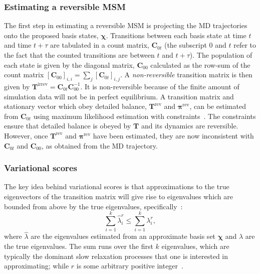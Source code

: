 \documentclass[journal=jacsat,manuscript=article]{achemso}
\begin{document}
\subsubsection{Estimating a reversible MSM}

The first step in estimating a reversible MSM is projecting the MD trajectories onto the proposed basis states, $\bm{\chi}$. Transitions between each basis state at time $t$ and time $t + \tau$ are tabulated in a count matrix, $\mathbf{C}_{0t}$ (the subscript $0$ and $t$ refer to the fact that the counted transitions are between $t$ and $t+\tau$). The population of each state is given by the diagonal matrix, $\mathbf{C}_{00}$ calculated as the row-sum of the count matrix $[\mathbf{C}_{00}]_{i, i} = \sum_j [\mathbf{C}_{0t}]_{i, j}$.  A \emph{non-reversible} transition matrix is then given by $\mathbf{T}^{\mathrm{irrev}} = \mathbf{C}_{0t}\mathbf{C}_{00}^{-1}$. It is non-reversible because of the finite amount of simulation data will not be in perfect equilibrium. A transition matrix and stationary vector which obey detailed balance, $\mathbf{T}^{\mathrm{rev}}$ and $\bm{\pi}^{\mathrm{rev}}$, can be estimated from $\mathbf{C}_{0t}$ using maximum likelihood estimation with constraints~\cite{trendelkamp-schroer_estimation_2015}. The constraints ensure that detailed balance is obeyed by $\mathbf{T}$ and its dynamics are reversible.  However, once $\mathbf{T}^{\mathrm{rev}}$ and $\bm{\pi}^{\mathrm{rev}}$ have been estimated, they are now inconsistent with $\mathbf{C}_{0t}$ and $\mathbf{C}_{00}$, as obtained from the MD trajectory.

\subsubsection{Variational scores}

The key idea behind variational scores is that approximations to the true eigenvectors of the transition matrix will give rise to eigenvalues which are bounded from above by the true eigenvalues, specifically~\cite{mcgibbonVariationalCrossvalidationSlow2015, wuVariationalApproachLearning2020c}: 
\begin{equation}\label{eqn:var_principle}
    \sum_{i=1}^{k}\hat{\lambda}_{i}^{r} \leq \sum_{i=1}^{k}\lambda_{i}^{r},
\end{equation}
where $\hat{\lambda}$ are the eigenvalues estimated from an approximate basis set $\bm{\chi}$ and $\lambda$ are the true eigenvalues. The sum runs over the first $k$ eigenvalues, which are typically the dominant slow relaxation processes that one is interested in approximating; while $r$ is some arbitrary positive integer~\cite{wuVariationalApproachLearning2020c}.
\end{document}
